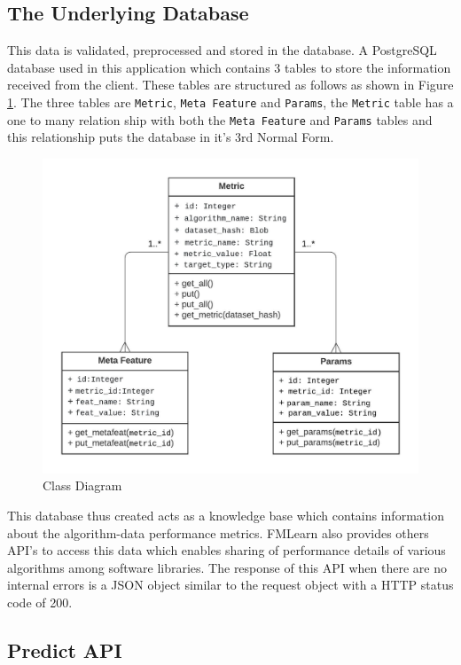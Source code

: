 \subsection*{The Underlying Database}

This data is validated, preprocessed and stored in the database. A PostgreSQL database used in this application which contains 3 tables to store the information received from the client. These tables are structured as follows as shown in Figure \ref{class-diagram}. The three tables are \texttt{Metric}, \texttt{Meta Feature} and \texttt{Params}, the \texttt{Metric} table has a one to many relation ship with both the \texttt{Meta Feature} and \texttt{Params} tables and this relationship puts the database in it's 3rd Normal Form.

\begin{figure}[t]
    \centering
    \includegraphics[width=15cm]{images/Class Diagram.jpeg}
    \caption{Class Diagram}
    \label{class-diagram}
\end{figure}

This database thus created acts as a knowledge base which contains information about the algorithm-data performance metrics. FMLearn also provides others API's to access this data which enables sharing of performance details of various algorithms among software libraries. The response of this API when there are no internal errors is a JSON object similar to the request object with a HTTP status code of 200.

\subsection*{Predict API}

